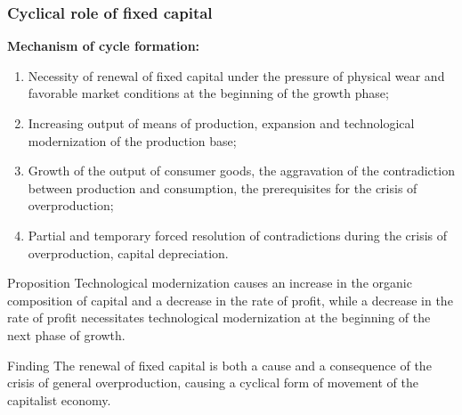 \begin{frame}
  \frametitle{Cyclical role of fixed capital}
  \textbf{Mechanism of cycle formation:}
  \begin{enumerate}
    \item Necessity of renewal of fixed capital under the pressure of physical wear and favorable market conditions at the beginning of the growth phase;
    \item Increasing output of means of production, expansion and technological modernization of the production base;
    \item Growth of the output of consumer goods, the aggravation of the contradiction between production and consumption, the prerequisites for the crisis of overproduction;
    \item Partial and temporary forced resolution of contradictions during the crisis of overproduction, capital depreciation.
  \end{enumerate}

  \begin{block}{Proposition}
    Technological modernization causes an increase in the organic composition of capital and a decrease in the rate of profit, while a decrease in the rate of profit necessitates technological modernization at the beginning of the next phase of growth.
  \end{block}

  \begin{alertblock}{Finding}
    The renewal of fixed capital is both a cause and a consequence of the crisis of general overproduction, causing a cyclical form of movement of the capitalist economy.
  \end{alertblock}
\end{frame}


